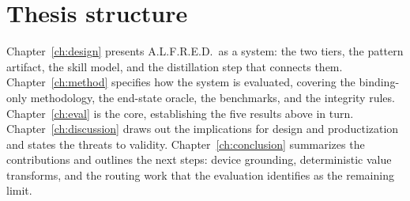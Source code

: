 \section{Thesis structure}
\label{sec:structure}

Chapter~\ref{ch:design} presents A.L.F.R.E.D.\ as a system: the two tiers, the
pattern artifact, the skill model, and the distillation step that connects them.
Chapter~\ref{ch:method} specifies how the system is evaluated, covering the
binding-only methodology, the end-state oracle, the benchmarks, and the integrity
rules. Chapter~\ref{ch:eval} is the core, establishing the five results above in
turn. Chapter~\ref{ch:discussion} draws out the implications for design and
productization and states the threats to validity. Chapter~\ref{ch:conclusion}
summarizes the contributions and outlines the next steps: device grounding,
deterministic value transforms, and the routing work that the evaluation
identifies as the remaining limit.

